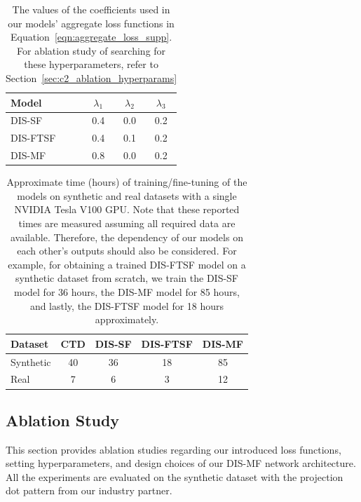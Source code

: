 \begin{table}[t]
    \begin{center}
        \begin{tabular}{lccc}
        \hline
        Model & $\lambda_{1}$ & $\lambda_{2}$ & $\lambda_{3}$ \\
        \hline
        DIS-SF & 0.4 & 0.0 & 0.2 \\
        DIS-FTSF & 0.4 & 0.1 & 0.2 \\
        DIS-MF & 0.8 & 0.0 & 0.2 \\
        \hline
        \end{tabular}
    \end{center}
    \caption{The values of the coefficients used in our models' aggregate loss functions in Equation~\eqref{eqn:aggregate_loss_supp}. For ablation study of searching for these hyperparameters, refer to Section~\ref{sec:c2_ablation_hyperparams}}
    \label{table:coef_supp}
\end{table}

\begin{table}[b]
    \begin{center}
        \begin{tabular}{lcccc}
        \hline
        Dataset & CTD\cite{riegler2019connecting} & DIS-SF & DIS-FTSF & DIS-MF \\
        \hline
        Synthetic & 40 & 36 & 18 & 85 \\
        Real & 7 & 6 & 3 & 12\\
        \hline
        \end{tabular}
    \end{center}
    \caption{Approximate time (hours) of training/fine-tuning of the models on synthetic and real datasets with a single NVIDIA Tesla V100 GPU. Note that these reported times are measured assuming all required data are available. Therefore, the dependency of our models on each other's outputs should also be considered. For example, for obtaining a trained DIS-FTSF model on a synthetic dataset from scratch, we train the DIS-SF model for 36 hours, the DIS-MF model for 85 hours, and lastly, the DIS-FTSF model for 18 hours approximately.}
    \label{table:train_time_supp}
\end{table}

\subsection{Ablation Study} \label{sec:c2_ablation}
This section provides ablation studies regarding our introduced loss functions, setting hyperparameters, and design choices of our DIS-MF network architecture. All the experiments are evaluated on the synthetic dataset with the projection dot pattern from our industry partner.

